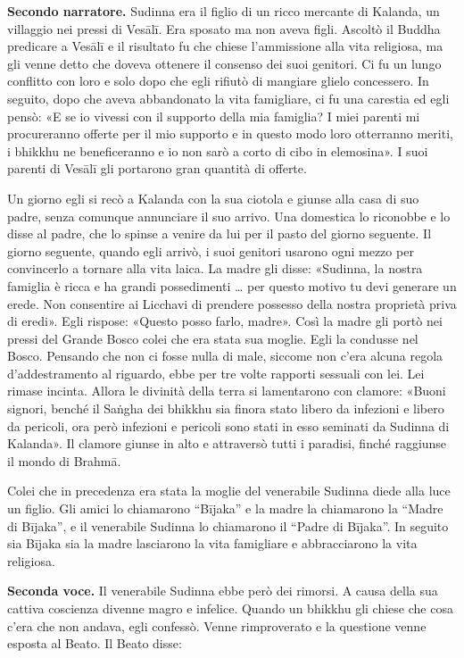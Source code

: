\textbf{Secondo narratore.} Sudinna era il figlio di un ricco mercante di
Kalanda, un villaggio nei pressi di Vesālī. Era sposato ma non aveva
figli. Ascoltò il Buddha predicare a Vesālī e il risultato fu che chiese
l’ammissione alla vita religiosa, ma gli venne detto che doveva ottenere
il consenso dei suoi genitori. Ci fu un lungo conflitto con loro e solo
dopo che egli rifiutò di mangiare glielo concessero. In seguito, dopo
che aveva abbandonato la vita famigliare, ci fu una carestia ed egli
pensò: «E se io vivessi con il supporto della mia famiglia? I miei
parenti mi procureranno offerte per il mio supporto e in questo modo
loro otterranno meriti, i bhikkhu ne beneficeranno e io non sarò a
corto di cibo in elemosina». I suoi parenti di Vesālī gli portarono gran
quantità di offerte.


Un giorno egli si recò a Kalanda con la sua ciotola e giunse alla casa
di suo padre, senza comunque annunciare il suo arrivo. Una domestica lo
riconobbe e lo disse al padre, che lo spinse a venire da lui per il
pasto del giorno seguente. Il giorno seguente, quando egli arrivò, i
suoi genitori usarono ogni mezzo per convincerlo a tornare alla vita
laica. La madre gli disse: «Sudinna, la nostra famiglia è ricca e ha
grandi possedimenti … per questo motivo tu devi generare un erede. Non
consentire ai Licchavi di prendere possesso della nostra proprietà priva
di eredi». Egli rispose: «Questo posso farlo, madre». Così la madre gli
portò nei pressi del Grande Bosco colei che era stata sua moglie. Egli
la condusse nel Bosco. Pensando che non ci fosse nulla di male, siccome
non c’era alcuna regola d’addestramento al riguardo, ebbe per tre volte
rapporti sessuali con lei. Lei rimase incinta. Allora le divinità della
terra si lamentarono con clamore: «Buoni signori, benché il Saṅgha dei
bhikkhu sia finora stato libero da infezioni e libero da pericoli, ora
però infezioni e pericoli sono stati in esso seminati da Sudinna di
Kalanda». Il clamore giunse in alto e attraversò tutti i paradisi,
finché raggiunse il mondo di Brahmā.


Colei che in precedenza era stata la moglie del venerabile Sudinna diede
alla luce un figlio. Gli amici lo chiamarono “Bījaka” e la madre la
chiamarono la “Madre di Bījaka”, e il venerabile Sudinna lo chiamarono
il “Padre di Bījaka”. In seguito sia Bījaka sia la madre lasciarono la
vita famigliare e abbracciarono la vita religiosa.


\textbf{Seconda voce.} Il venerabile Sudinna ebbe però dei rimorsi. A causa della
sua cattiva coscienza divenne magro e infelice. Quando un bhikkhu gli
chiese che cosa c’era che non andava, egli confessò. Venne rimproverato
e la questione venne esposta al Beato. Il Beato disse:


